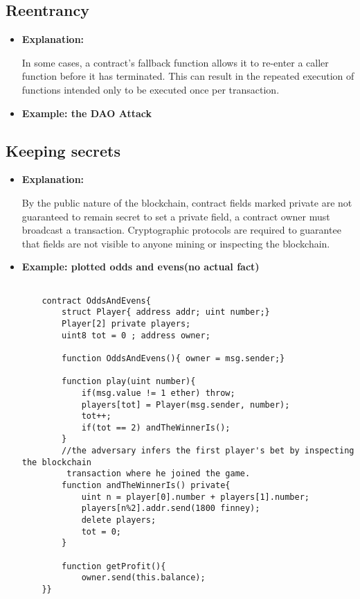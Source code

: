 \documentclass{llncs}
\begin{document}
\subsection{Reentrancy}
\begin{itemize}
\item \textbf{Explanation:} 

In some cases, a contract’s fallback function allows it to re-enter a caller function before it has terminated. This can result in the repeated execution of functions intended only to be executed once per transaction.
\item \textbf{Example: the DAO Attack}

\end{itemize}

\subsection{Keeping secrets}
\begin{itemize}
\item \textbf{Explanation:} 

By the public nature of the blockchain, contract fields marked private are not guaranteed to remain secret to set a private field, a contract owner must broadcast a transaction. Cryptographic protocols are required to guarantee that fields are not visible to anyone mining or inspecting the blockchain.
\item \textbf{Example: plotted odds and evens(no actual fact)}

	\begin{minipage}{.5\textwidth} 
	{\scriptsize
	\begin{verbatim}
	
	contract OddsAndEvens{
	    struct Player{ address addr; uint number;}
	    Player[2] private players;
	    uint8 tot = 0 ; address owner;
	    
	    function OddsAndEvens(){ owner = msg.sender;}
	    
	    function play(uint number){
	        if(msg.value != 1 ether) throw;
	        players[tot] = Player(msg.sender, number);
	        tot++;
	        if(tot == 2) andTheWinnerIs();
	    }
	    //the adversary infers the first player's bet by inspecting the blockchain
	     transaction where he joined the game.
	    function andTheWinnerIs() private{
	        uint n = player[0].number + players[1].number;
	        players[n%2].addr.send(1800 finney);
	        delete players;
	        tot = 0;
	    }
	    
	    function getProfit(){
	        owner.send(this.balance);
	}}

	\end{verbatim} }
	\end{minipage}	

\end{itemize}
\end{document}
